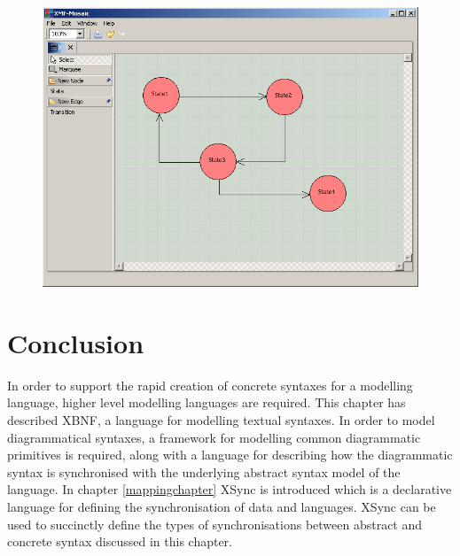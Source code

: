 \begin{figure}[htb]
\begin{center}
\includegraphics[width=16cm]{ConcreteSyntax/figures/stateMachineTool.png}
\caption{}
\label{stateMachineTool}
\end{center}
\end{figure}

\section{Conclusion}

In order to support the rapid creation of concrete syntaxes for a modelling language, higher level modelling languages are required. This chapter has described XBNF, a language for modelling textual syntaxes. In order to model diagrammatical syntaxes, a framework for modelling common diagrammatic primitives is required, along with a language for describing how the diagrammatic syntax is synchronised with the underlying abstract syntax model of the language.  In chapter \ref{mappingchapter} XSync is introduced which is a declarative language for defining the synchronisation of data and languages.  XSync can be used to succinctly define the types of synchronisations between abstract and concrete syntax discussed in this chapter.
